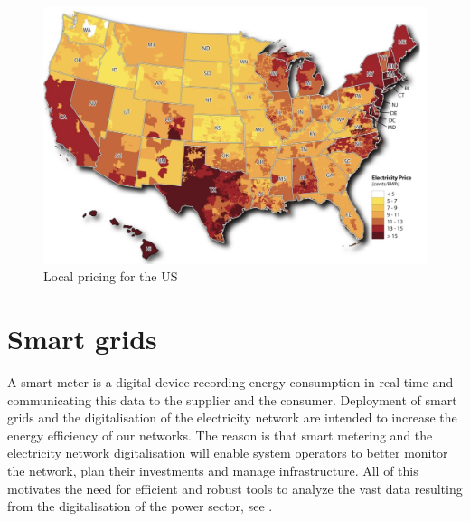 \begin{figure}[!h]
    \includegraphics[width=\textwidth]{images/us_local.png}
    \caption[Local pricing for the US]{Local pricing for the US }
    \label{fig:us_local}
\end{figure}

\section{Smart grids}
A smart meter is a digital device recording energy consumption in real time and communicating this data to the supplier and the consumer.
Deployment of smart grids and the digitalisation of the electricity network are intended to increase the energy efficiency of our networks.
The reason is that smart metering and the electricity network digitalisation  will enable system operators to better monitor the network, plan their investments and manage infrastructure. 
All of this motivates the need for efficient and robust tools to analyze the vast data resulting from the digitalisation of the power sector, see \cite{declean,andreadou2016telecommunication}.


